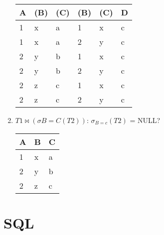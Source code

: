 \documentclass{article}
\begin{document}
\begin{enumerate}
\begin{table}[!h] \centering
\begin{tabular}{|l|l|l|l|l|l|}
\hline
\textbf{A} & \textbf{(B)} & \textbf{(C)} & \textbf{(B)} & \textbf{(C)} & \textbf{D} \\ \hline
1          & x            & a            & 1            & x            & c          \\ \hline
1          & x            & a            & 2            & y            & c          \\ \hline
2          & y            & b            & 1            & x            & c          \\ \hline
2          & y            & b            & 2            & y            & c          \\ \hline
2          & z            & c            & 1            & x            & c          \\ \hline
2          & z            & c            & 2            & y            & c          \\ \hline
\end{tabular}
\end{table}
    \item $T1 \bowtie (\sigma{B=C}(T2))$: 
         \color{red}$\sigma_{B=c}(T2)$ = NULL?
    \color{black}
\begin{table}[!h] \centering
\begin{tabular}{|l|l|l|}
\hline
\textbf{A} & \textbf{B} & \textbf{C} \\ \hline
1          & x          & a          \\ \hline
2          & y          & b          \\ \hline
2          & z          & c          \\ \hline
\end{tabular}
\end{table}
\end{enumerate}

\newpage
\section{SQL}
\end{document}
